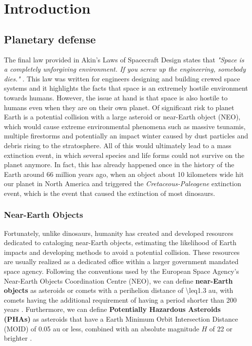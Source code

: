 \chapter{Introduction}
\label{chap:introduction}

\section{Planetary defense}
\label{sec:planetary_defense}

The final law provided in Akin's Laws of Spacecraft Design states that \textit{"Space is a completely unforgiving environment. If you screw up the engineering, somebody dies."} \cite{akinslaws}. This law was written for engineers designing and building crewed space systems and it highlights the facts that space is an extremely hostile environment towards humans. However, the issue at hand is that space is also hostile to humans even when they are on their own planet. Of significant risk to planet Earth is a potential collision with a large asteroid or near-Earth object (NEO), which would cause extreme environmental phenomena such as massive tsunamis, multiple firestorms and potentially an impact winter caused by dust particles and debris rising to the stratosphere. All of this would ultimately lead to a mass extinction event, in which several species and life forms could not survive on the planet anymore. In fact, this has already happened once in the history of the Earth around 66 million years ago, when an object about 10 kilometers wide hit our planet in North America and triggered the \textit{Cretaceous-Paleogene} extinction event, which is the event that caused the extinction of most dinosaurs.

\subsection{Near-Earth Objects}
\label{ssec:neo}

Fortunately, unlike dinosaurs, humanity has created and developed resources dedicated to cataloging near-Earth objects, estimating the likelihood of Earth impacts and developing methods to avoid a potential collision. These resources are usually realized as a dedicated office within a larger government mandated space agency. Following the conventions used by the European Space Agency's Near-Earth Objects Coordination Centre (NEO), we can define \textbf{near-Earth objects} as asteroids or comets with a perihelion distance of \num{\leq1.3} \si{\astronomicalunit}, with comets having the additional requirement of having a period shorter than \num{200} years \cite{neo_definition}. Furthermore, we can define \textbf{Potentially Hazardous Asteroids (PHAs)} as asteroids that have a Earth Minimum Orbit Intersection Distance (MOID) of \num{0.05} \si{\astronomicalunit} or less, combined with an absolute magnitude $H$ of \num{22} or brighter \cite{neo_definition}. 


